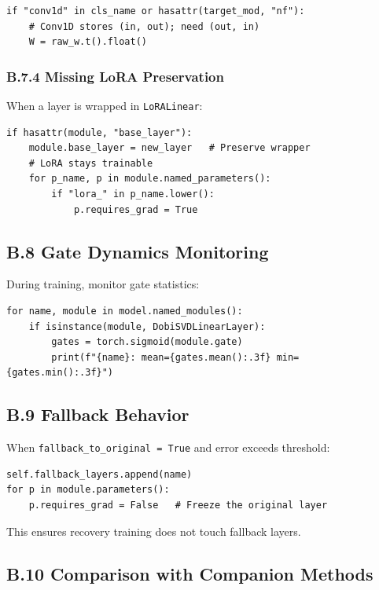 \begin{lstlisting}
if "conv1d" in cls_name or hasattr(target_mod, "nf"):
    # Conv1D stores (in, out); need (out, in)
    W = raw_w.t().float()
\end{lstlisting}

\subsubsection{B.7.4 Missing LoRA Preservation}

When a layer is wrapped in \texttt{LoRALinear}:

\begin{lstlisting}
if hasattr(module, "base_layer"):
    module.base_layer = new_layer   # Preserve wrapper
    # LoRA stays trainable
    for p_name, p in module.named_parameters():
        if "lora_" in p_name.lower():
            p.requires_grad = True
\end{lstlisting}

\subsection{B.8 Gate Dynamics Monitoring}

During training, monitor gate statistics:

\begin{lstlisting}
for name, module in model.named_modules():
    if isinstance(module, DobiSVDLinearLayer):
        gates = torch.sigmoid(module.gate)
        print(f"{name}: mean={gates.mean():.3f} min={gates.min():.3f}")
\end{lstlisting}

\subsection{B.9 Fallback Behavior}

When \texttt{fallback\_to\_original = True} and error exceeds threshold:

\begin{lstlisting}
self.fallback_layers.append(name)
for p in module.parameters():
    p.requires_grad = False   # Freeze the original layer
\end{lstlisting}

This ensures recovery training does not touch fallback layers.

\subsection{B.10 Comparison with Companion Methods}

